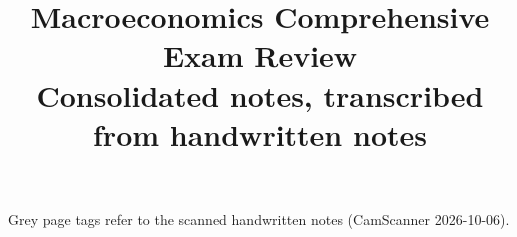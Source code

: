 \documentclass[10.5pt]{article}
\title{\textbf{Macroeconomics Comprehensive Exam Review}\\[2pt]\large Consolidated notes, transcribed from handwritten notes}
\author{}\date{}
\begin{document}
\maketitle
\vspace{-2.5em}
\begin{center}\small Grey page tags refer to the scanned handwritten notes (CamScanner 2026-10-06).\end{center}
\tableofcontents
\newpage







\appendix

\end{document}
